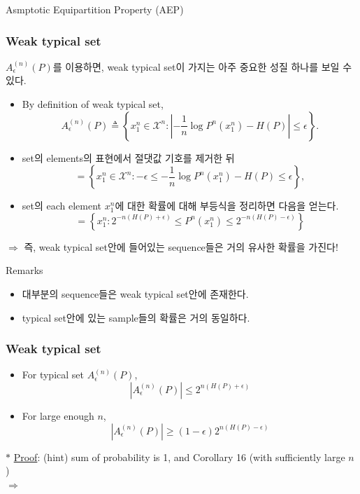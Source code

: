 \documentclass[9pt]{beamer}
\begin{document}
\begin{section}{Asmptotic Equipartition Property (AEP)}
        \begin{frame}
            \frametitle{Weak typical set}
            $A_{\epsilon}^{(n)}(P)$를 이용하면, weak typical set이 가지는 아주 중요한 성질 하나를 보일 수 있다.
            \begin{itemize}
                \item By definition of weak typical set,
                $$ A_\epsilon^{(n)}(P) \triangleq\left\{x_1^n \in \mathcal X^n:\left|-\frac{1}{n} \log P^n\left(x_1^n\right)-H(P)\right| \leq \epsilon\right\}. $$
                \item set의 elements의 표현에서 절댓값 기호를 제거한 뒤
                $$ = \left\{x_1^n \in \mathcal X^n: -\epsilon \le  -\frac{1}{n} \log P^n\left(x_1^n\right)-H(P) \leq \epsilon\right\},$$
                \item set의 each element $x_1^n$에 대한 확률에 대해 부등식을 정리하면 다음을 얻는다.
                $$ = \left\{x_1^n: 2^{-n(H(P)+\epsilon)} \leq P^n\left(x_1^n\right) \leq 2^{-n(H(P)-\epsilon)}\right\}$$
            \end{itemize}
            $\Rightarrow$ 즉, weak typical set안에 들어있는 sequence들은 \alert{거의 유사한 확률}을 가진다!
            \vspace{0.3cm}
            \begin{block}{Remarks}
                \begin{itemize}
                    \item 대부분의 sequence들은 weak typical set안에 존재한다.
                    \item typical set안에 있는 sample들의 확률은 거의 동일하다.
                \end{itemize}
            \end{block}

        \end{frame}  

        \begin{frame}
            \frametitle{Weak typical set}
            \begin{corollary}
                \begin{itemize}
                    \item For typical set $A_{\epsilon}^{(n)}(P)$,
                    $$ |A_\epsilon^{(n)}(P)| \le 2^{n(H(P)+\epsilon)} $$
                    \item For large enough $n$,
                    $$ |A_\epsilon ^{(n)} (P)| \ge (1-\epsilon) 2^{n{(H(P)-\epsilon)}} $$
                \end{itemize}
            \end{corollary}
            \vspace{0.2cm}
            $\ast$ \underline{Proof}: (hint) sum of probability is 1, and Corollary 16 (with sufficiently large $n$)
            \\$\Rightarrow$
            \vspace{2cm}
        

\end{frame}
\end{section}
\end{document}
